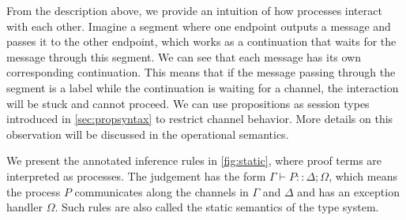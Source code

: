 \documentclass[12pt, openany]{memoir}
\newcommand*{\judge}[4]{#1 \vdash #2 :: #3; #4}
\begin{document}
From the description above, we provide an intuition of how processes interact with each other. 
Imagine a segment where one endpoint outputs a message and passes it to the other endpoint, 
which works as a continuation that waits for the message through this segment.
We can see that each message has its own corresponding continuation. 
This means that if the message passing through the segment is a label while the continuation is waiting for a channel, 
the interaction will be stuck and cannot proceed. 
We can use propositions as session types introduced in \cref{sec:propsyntax} to restrict channel behavior. 
More details on this observation will be discussed in the operational semantics.

We present the annotated inference rules in \cref{fig:static}, where proof terms are interpreted as processes. 
The judgement has the form $\judge{\Gamma}{P}{\Delta}{\Omega}$, 
which means the process $P$ communicates along the channels in $\Gamma$ and $\Delta$ and has an exception handler $\Omega$. 
Such rules are also called the static semantics of the type system.
\end{document}
